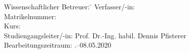 \begin{titlepage}
\begin{center}
\begin{minipage}{\textwidth}
\begin{tabbing}
	Wissenschaftlicher Betreuer: \hspace{0.85cm}\=\kill
	Verfasser/-in: \> \DerAutorDerArbeit \\[1.5mm]
	Matrikelnummer:  \\[1.5mm]
	Kurs: \> \DieKursbezeichnung \\[1.5mm]
	Studiengangsleiter/-in: \> Prof. Dr.-Ing. habil. Dennis Pfisterer \\[1.5mm]
	Bearbeitungszeitraum: .--08.05.2020
\end{tabbing}
\end{minipage}

\end{center}

\end{titlepage}